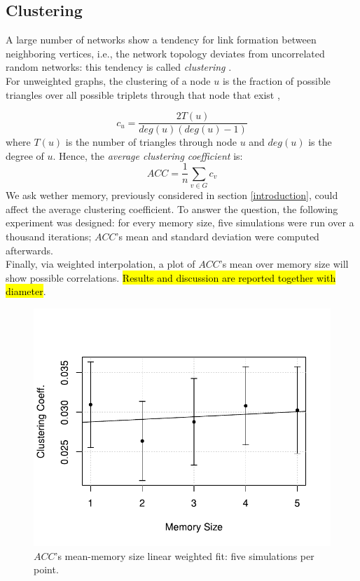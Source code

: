 \subsection{Clustering} \label{clustering}
A large number of networks show a tendency for link formation between neighboring vertices,
i.e., the network topology deviates from uncorrelated random networks: this tendency is called
\textit{clustering} \cite{clusterarticle}. \\
For unweighted graphs, the clustering of a node $u$ is the fraction of possible triangles over
all possible triplets  through that node that exist \cite{clustersite},

\begin{equation}
\label{eq:clustering}
c_u = \frac{2 T(u)}{deg(u)(deg(u)-1)}
\end{equation}
where $T(u)$ is the number of triangles through node $u$ and $deg(u)$ is the degree of $u$.
Hence, the \textit{average clustering coefficient}  is:
\begin{equation}
\label{eq:average_clustering}
ACC = \frac{1}{n}\sum_{v \in G} c_v
\end{equation}
We ask wether memory, previously considered in section \ref{introduction}, could affect the
average clustering coefficient.
To answer the question, the following experiment was designed:
for every memory size, five simulations were run over a thousand iterations; $ACC$'s mean and
standard deviation were computed afterwards.\\
Finally, via weighted interpolation, a plot of $ACC$'s mean over memory size will show possible
 correlations. \hl{Results and discussion are reported together with diameter}.
\begin{figure}[h]
  \centering
  \includegraphics[trim={0cm 0cm 0cm 1cm},clip,width=.8\columnwidth]{img/clustering.pdf}
  \caption{$ACC$'s mean-memory size linear weighted fit: five simulations per point.}
  \label{fig:clustering}
\end{figure}
